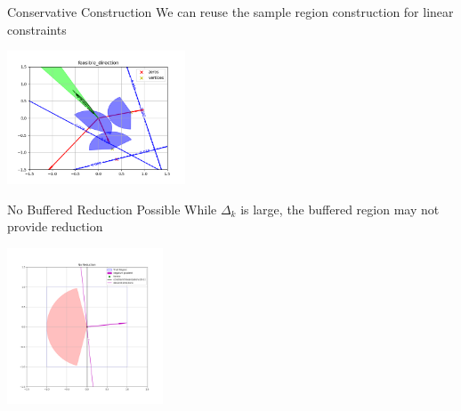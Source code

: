 \documentclass{beamer}
\newcommand{\dk}{{\Delta_k}}
\begin{document}
\begin{frame}{Conservative Construction}
	We can reuse the sample region construction for linear constraints
	\begin{center}
		\includegraphics[width=200px]{images/feasible_direction.png}
	\end{center}
\end{frame}





\begin{frame}{No Buffered Reduction Possible}
	While $\Delta_k$ is large, the buffered region may not provide reduction
	\begin{center}
		\includegraphics[width=175px]{images/no_reduction.png}
	\end{center}
\end{frame}
\end{document}
